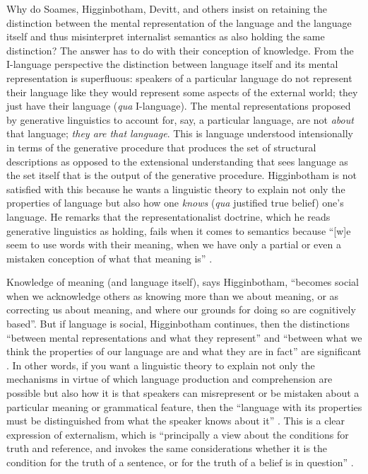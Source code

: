 Why do Soames, Higginbotham, Devitt, and others insist on retaining the distinction between the mental representation of the language and the language itself and thus misinterpret internalist semantics as also holding the same distinction? The answer has to do with their conception of knowledge. From the I-language perspective the distinction between language itself and its mental representation is superfluous: speakers of a particular language do not represent their language like they would represent some aspects of the external world; they just have their language (\textit{qua} I-language). The mental representations proposed by generative linguistics to account for, say, a particular language, are not \textit{about} that language; \textit{they are that language}. This is language understood intensionally in terms of the generative procedure that produces the set of structural descriptions as opposed to the extensional understanding that sees language as the set itself that is the output of the generative procedure. Higginbotham is not satisfied with this because he wants a linguistic theory to explain not only the properties of language but also how one \textit{knows} (\textit{qua} justified true belief) one’s language. He remarks that the representationalist doctrine, which he reads generative linguistics as holding, fails when it comes to semantics because “[w]e seem to use words with their meaning, when we have only a partial or even a mistaken conception of what that meaning is” \citep[563]{Higginbotham1991}. 

Knowledge of meaning (and language itself), says Higginbotham, “becomes social when we acknowledge others as knowing more than we about meaning, or as correcting us about meaning, and where our grounds for doing so are cognitively based”. But if language is social, Higginbotham continues, then the distinctions “between mental representations and what they represent” and “between what we think the properties of our language are and what they are in fact” are significant \citep[563]{Higginbotham1991}. In other words, if you want a linguistic theory to explain not only the mechanisms in virtue of which language production and comprehension are possible but also how it is that speakers can misrepresent or be mistaken about a particular meaning or grammatical feature, then the “language with its properties must be distinguished from what the speaker knows about it” \citep[563]{Higginbotham1991}. This is a clear expression of externalism, which is “principally a view about the conditions for truth and reference, and invokes the same considerations whether it is the condition for the truth of a sentence, or for the truth of a belief is in question” \citep[328]{Farkas2006}.

